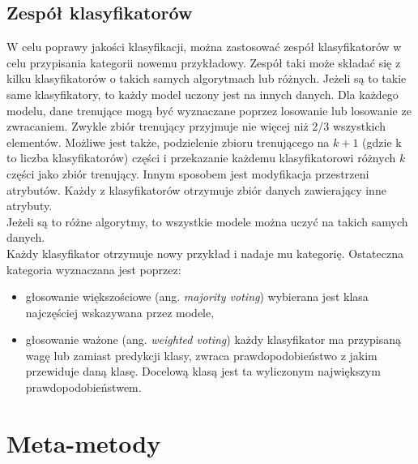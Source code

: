   	
\subsection{Zespół klasyfikatorów}
W celu poprawy jakości klasyfikacji, można zastosować zespół klasyfikatorów w celu przypisania kategorii nowemu przykładowy. Zespół taki może składać się z kilku klasyfikatorów o takich samych algorytmach lub różnych. Jeżeli są to takie same klasyfikatory, to każdy model uczony jest na innych danych. Dla każdego modelu, dane trenujące mogą być wyznaczane poprzez losowanie lub losowanie ze zwracaniem. Zwykle zbiór trenujący przyjmuje nie więcej niż 2/3 wszystkich elementów. Możliwe jest także, podzielenie zbioru trenującego na $k+1$ (gdzie k to liczba klasyfikatorów) części i przekazanie każdemu klasyfikatorowi różnych $k$ części jako zbiór trenujący. Innym sposobem jest modyfikacja przestrzeni atrybutów. Każdy z klasyfikatorów otrzymuje zbiór danych zawierający inne atrybuty. \\
Jeżeli są to różne algorytmy, to wszystkie modele można uczyć na takich samych danych. \\
Każdy klasyfikator otrzymuje nowy przykład i nadaje mu kategorię. Ostateczna kategoria wyznaczana jest poprzez:
\begin{itemize}
	\item głosowanie większościowe (ang. \textit{majority voting}) wybierana jest klasa najczęściej wskazywana przez modele,
	\item głosowanie ważone (ang. \textit{weighted voting}) każdy klasyfikator ma przypisaną wagę lub zamiast predykcji klasy, zwraca prawdopodobieństwo z jakim przewiduje daną klasę. Docelową klasą jest ta wyliczonym największym prawdopodobieństwem.
\end{itemize} 
\section{Meta-metody}
